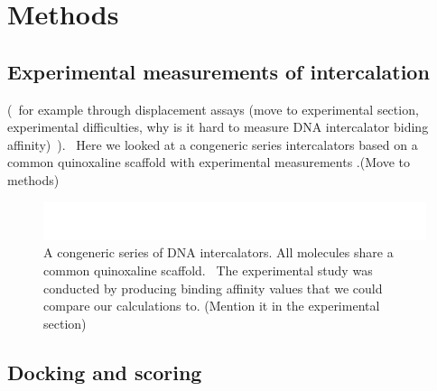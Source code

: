 \chapter{Methods}

\section{Experimental measurements of intercalation}


(~for example through displacement assays (move to experimental section, experimental difficulties, why is it hard to measure DNA intercalator biding affinity)~). ~Here we looked at a congeneric series intercalators based on a common quinoxaline scaffold with experimental measurements \cite{}.(Move to methods)~

\begin{figure}[h]
	\includegraphics[width=\textwidth]{intercalators.pdf}
	\caption{A congeneric series of DNA intercalators. All molecules share a common quinoxaline scaffold. ~The experimental study was conducted by \cite{} producing binding affinity values that we could compare our calculations to. (Mention it in the experimental section)~ }
	\label{fig:intercalators}
\end{figure}


\section{Docking and scoring}

